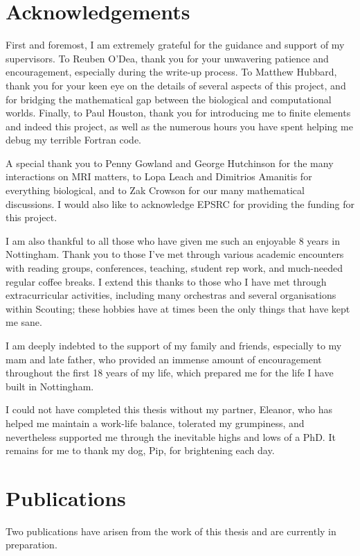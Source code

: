 \documentclass[a4paper, 12pt, oneside, colorinlistoftodos]{book}
\begin{document}
    \chapter*{Acknowledgements}
        First and foremost, I am extremely grateful for the guidance and support of my supervisors. To Reuben O'Dea, thank you for your unwavering patience and encouragement, especially during the write-up process. To Matthew Hubbard, thank you for your keen eye on the details of several aspects of this project, and for bridging the mathematical gap between the biological and computational worlds. Finally, to Paul Houston, thank you for introducing me to finite elements and indeed this project, as well as the numerous hours you have spent helping me debug my terrible Fortran code.

        A special thank you to Penny Gowland and George Hutchinson for the many interactions on MRI matters, to Lopa Leach and Dimitrios Amanitis for everything biological, and to Zak Crowson for our many mathematical discussions. I would also like to acknowledge EPSRC for providing the funding for this project.

        I am also thankful to all those who have given me such an enjoyable 8 years in Nottingham. Thank you to those I've met through various academic encounters with reading groups, conferences, teaching, student rep work, and much-needed regular coffee breaks. I extend this thanks to those who I have met through extracurricular activities, including many orchestras and several organisations within Scouting; these hobbies have at times been the only things that have kept me sane.

        I am deeply indebted to the support of my family and friends, especially to my mam and late father, who provided an immense amount of encouragement throughout the first 18 years of my life, which prepared me for the life I have built in Nottingham.

        I could not have completed this thesis without my partner, Eleanor, who has helped me maintain a work-life balance, tolerated my grumpiness, and nevertheless supported me through the inevitable highs and lows of a PhD. It remains for me to thank my dog, Pip, for brightening each day.

    \renewcommand{\thesection}{\hspace{-6pt}}
    \chapter*{Publications}
        Two publications have arisen from the work of this thesis and are currently in preparation.
\end{document}
